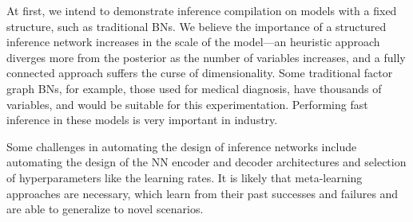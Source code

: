 At first, we intend to demonstrate inference compilation on models with a fixed structure, such as traditional BNs. We believe the importance of a structured inference network increases in the scale of the model---an heuristic approach diverges more from the posterior as the number of variables increases, and a fully connected approach suffers the curse of dimensionality. Some traditional factor graph BNs, for example, those used for medical diagnosis, have thousands of variables, and would be suitable for this experimentation. Performing fast inference in these models is very important in industry. %

Some challenges in automating the design of inference networks include automating the design of the NN encoder and decoder architectures and selection of hyperparameters like the learning rates. It is likely that meta-learning approaches are necessary, which learn from their past successes and failures and are able to generalize to novel scenarios.